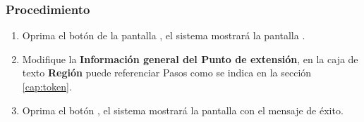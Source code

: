 \subsubsection{Procedimiento}
\begin{enumerate}
	\item Oprima el botón \btnEditar de la pantalla , el sistema mostrará la pantalla . 

	
	\item Modifique la \textbf{Información general del Punto de extensión}, en la caja de texto \textbf{Región} puede referenciar Pasos como se indica en la sección \ref{cap:token}.
	
	\item Oprima el botón , el sistema mostrará la pantalla  con el mensaje de éxito.
\end{enumerate}
